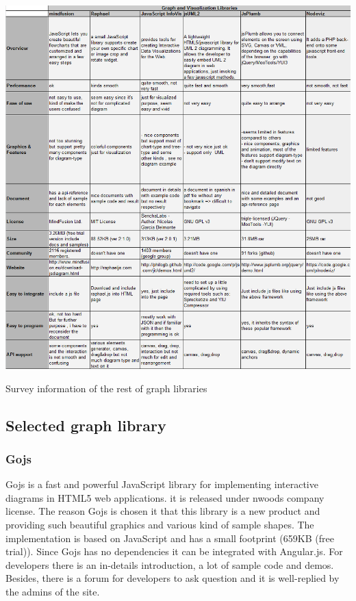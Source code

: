 \documentclass[14pt,a4paper]{extreport}
\begin{document}
 			 \begin{table}[ht]
 				\begin{center}
 					\includegraphics[scale=0.5]{GraphLibrary2.png}
 					\caption{Survey information of the rest of graph libraries }
 					\label{graphrest}
 				\end{center}
 			\end{table}
		\subsection{Selected graph library}	
			\subsubsection{Gojs}
			Gojs is a fast and powerful JavaScript library for implementing interactive diagrams in HTML5 web applications. it is released under nwoods company license. The reason Gojs is chosen it that this library is a new product and providing such beautiful graphics and various kind of sample shapes. The implementation is based on JavaScript and has a small footprint (659KB (free trial)). Since Gojs has no dependencies it can be integrated with Angular.js. For developers there is an in-details introduction, a lot of sample code and demos. Besides, there is a forum for developers to ask question and it is well-replied by the admins of the site. 
				
\end{document}
